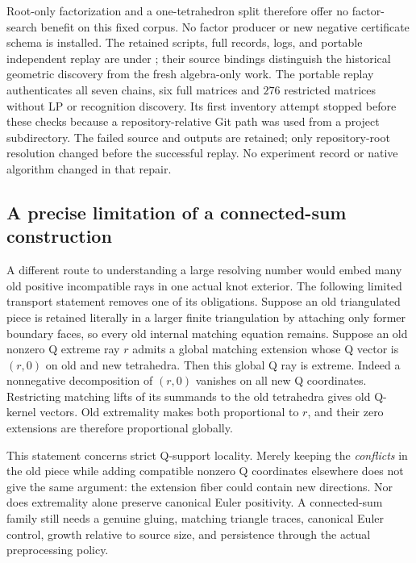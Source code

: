 Root-only factorization and a one-tetrahedron split therefore offer no
factor-search benefit on this fixed corpus.  No factor producer or new
negative certificate schema is installed.  The retained scripts, full
records, logs, and portable independent replay are under
; their source bindings distinguish the
historical geometric discovery from the fresh algebra-only work.
The portable replay authenticates all seven chains, six full matrices and
$276$ restricted matrices without LP or recognition discovery.  Its first
inventory attempt stopped before these checks because a repository-relative
Git path was used from a project subdirectory.  The failed source and outputs
are retained; only repository-root resolution changed before the successful
replay.  No experiment record or native algorithm changed in that repair.

\subsection{A precise limitation of a connected-sum construction}

A different route to understanding a large resolving number would embed
many old positive incompatible rays in one actual knot exterior.  The
following limited transport statement removes one of its obligations.
Suppose an old triangulated piece is retained literally in a larger finite
triangulation by attaching only former boundary faces, so every old internal
matching equation remains.  Suppose an old nonzero Q extreme ray $r$ admits
a global matching extension whose Q vector is $(r,0)$ on old and new
tetrahedra.  Then this global Q ray is extreme.  Indeed a nonnegative
decomposition of $(r,0)$ vanishes on all new Q coordinates.  Restricting
matching lifts of its summands to the old tetrahedra gives old Q-kernel
vectors.  Old extremality makes both proportional to $r$, and their zero
extensions are therefore proportional globally.

This statement concerns strict Q-support locality.  Merely keeping the
\emph{conflicts} in the old piece while adding compatible nonzero Q
coordinates elsewhere does not give the same argument: the extension fiber
could contain new directions.  Nor does extremality alone preserve canonical
Euler positivity.  A connected-sum family still needs a genuine gluing,
matching triangle traces, canonical Euler control, growth relative to source
size, and persistence through the actual preprocessing policy.

